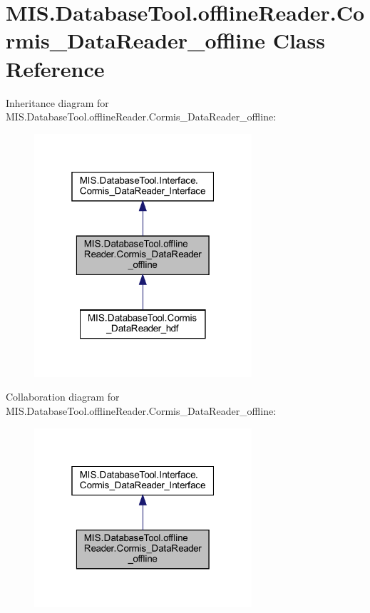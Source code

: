 \hypertarget{classMIS_1_1DatabaseTool_1_1offlineReader_1_1Cormis__DataReader__offline}{}\section{M\+I\+S.\+Database\+Tool.\+offline\+Reader.\+Cormis\+\_\+\+Data\+Reader\+\_\+offline Class Reference}
\label{classMIS_1_1DatabaseTool_1_1offlineReader_1_1Cormis__DataReader__offline}


Inheritance diagram for M\+I\+S.\+Database\+Tool.\+offline\+Reader.\+Cormis\+\_\+\+Data\+Reader\+\_\+offline\+:\nopagebreak
\begin{figure}[H]
\begin{center}
\leavevmode
\includegraphics[width=229pt]{classMIS_1_1DatabaseTool_1_1offlineReader_1_1Cormis__DataReader__offline__inherit__graph}
\end{center}
\end{figure}


Collaboration diagram for M\+I\+S.\+Database\+Tool.\+offline\+Reader.\+Cormis\+\_\+\+Data\+Reader\+\_\+offline\+:\nopagebreak
\begin{figure}[H]
\begin{center}
\leavevmode
\includegraphics[width=229pt]{classMIS_1_1DatabaseTool_1_1offlineReader_1_1Cormis__DataReader__offline__coll__graph}
\end{center}
\end{figure}
